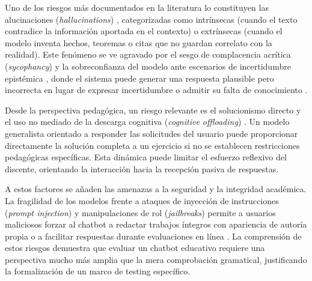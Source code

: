 Uno de los riesgos más documentados en la literatura lo constituyen las alucinaciones (\textit{hallucinations}) \cite{ji2023survey}, categorizadas como intrínsecas (cuando el texto contradice la información aportada en el contexto) o extrínsecas (cuando el modelo inventa hechos, teoremas o citas que no guardan correlato con la realidad). Este fenómeno se ve agravado por el sesgo de complacencia acrítica (\textit{sycophancy}) \cite{sharma2023towards} y la sobreconfianza del modelo ante escenarios de incertidumbre epistémica \cite{kadavath2022language, xiong2023can}, donde el sistema puede generar una respuesta plausible pero incorrecta en lugar de expresar incertidumbre o admitir su falta de conocimiento \cite{lin2022truthfulqa}.

Desde la perspectiva pedagógica, un riesgo relevante es el solucionismo directo y el uso no mediado de la descarga cognitiva (\textit{cognitive offloading}) \cite{risko2016cognitive}. Un modelo generalista orientado a responder las solicitudes del usuario puede proporcionar directamente la solución completa a un ejercicio si no se establecen restricciones pedagógicas específicas. Esta dinámica puede limitar el esfuerzo reflexivo del discente, orientando la interacción hacia la recepción pasiva de respuestas.

A estos factores se añaden las amenazas a la seguridad y la integridad académica. La fragilidad de los modelos frente a ataques de inyección de instrucciones (\textit{prompt injection}) \cite{greshake2023not} y manipulaciones de rol (\textit{jailbreaks}) \cite{wei2023jailbroken} permite a usuarios maliciosos forzar al chatbot a redactar trabajos íntegros con apariencia de autoría propia o a facilitar respuestas durante evaluaciones en línea \cite{unesco2023guidance}. La comprensión de estos riesgos demuestra que evaluar un chatbot educativo requiere una perspectiva mucho más amplia que la mera comprobación gramatical, justificando la formalización de un marco de testing específico.
